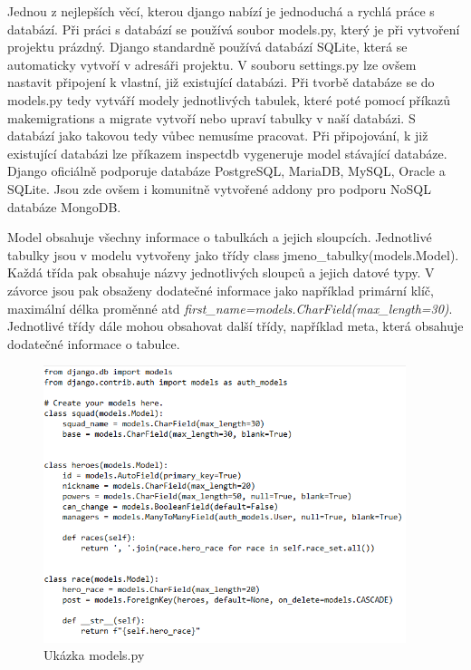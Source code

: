 Jednou z nejlepších věcí, kterou django nabízí je jednoduchá a rychlá
práce s databází. Při práci s databází se používá soubor models.py,
který je při vytvoření projektu prázdný. Django standardně používá
databází SQLite, která se automaticky vytvoří v adresáři projektu. V
souboru settings.py lze ovšem nastavit připojení k vlastní, již
existující databázi. Při tvorbě databáze se do models.py tedy vytváří
modely jednotlivých tabulek, které poté pomocí příkazů makemigrations
a migrate vytvoří nebo upraví tabulky v naší databázi. S databází jako
takovou tedy vůbec nemusíme pracovat. Při připojování, k již
existující databázi lze příkazem inspectdb vygeneruje model stávající
databáze. Django oficiálně podporuje databáze PostgreSQL, MariaDB,
MySQL, Oracle a SQLite. Jsou zde ovšem i komunitně vytvořené addony
pro podporu NoSQL databáze MongoDB.

Model obsahuje všechny informace o tabulkách a jejich
sloupcích. Jednotlivé tabulky jsou v modelu vytvořeny jako třídy class
jmeno\_tabulky(models.Model). Každá třída pak obsahuje názvy
jednotlivých sloupců a jejich datové typy. V závorce jsou pak obsaženy
dodatečné informace jako například primární klíč, maximální délka
proměnné atd
\textit{first\_name=models.CharField(max\_length=30)}. Jednotlivé
třídy dále mohou obsahovat další třídy, například meta, která obsahuje
dodatečné informace o tabulce.

\vspace{15px}

\begin{figure}[H] \centering
    \includegraphics[width=300pt]{./pictures/2-model-example.png}
    \caption[Model příklad]{Ukázka models.py \cite{}}
	\label{fig:Ukázka models.py}                                
\end{figure}

